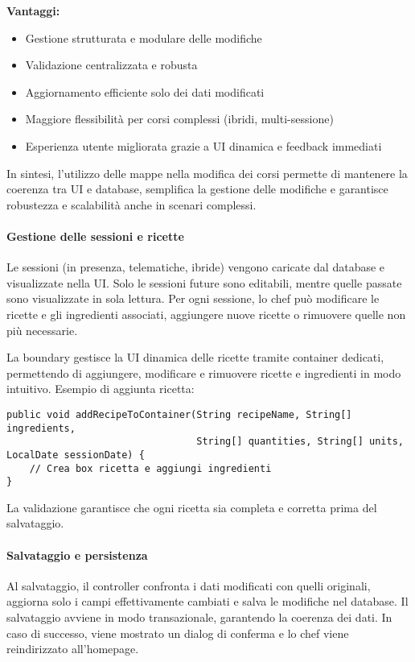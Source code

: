 \textbf{Vantaggi:}
\begin{itemize}
    \item Gestione strutturata e modulare delle modifiche
    \item Validazione centralizzata e robusta
    \item Aggiornamento efficiente solo dei dati modificati
    \item Maggiore flessibilità per corsi complessi (ibridi, multi-sessione)
    \item Esperienza utente migliorata grazie a UI dinamica e feedback immediati
\end{itemize}

In sintesi, l'utilizzo delle mappe nella modifica dei corsi permette di mantenere la coerenza tra UI e database, semplifica la gestione delle modifiche e garantisce robustezza e scalabilità anche in scenari complessi.

\paragraph{Gestione delle sessioni e ricette}
Le sessioni (in presenza, telematiche, ibride) vengono caricate dal database e visualizzate nella UI. Solo le sessioni future sono editabili, mentre quelle passate sono visualizzate in sola lettura. Per ogni sessione, lo chef può modificare le ricette e gli ingredienti associati, aggiungere nuove ricette o rimuovere quelle non più necessarie.

La boundary gestisce la UI dinamica delle ricette tramite container dedicati, permettendo di aggiungere, modificare e rimuovere ricette e ingredienti in modo intuitivo. Esempio di aggiunta ricetta:
\begin{verbatim}
public void addRecipeToContainer(String recipeName, String[] ingredients,
                                 String[] quantities, String[] units, LocalDate sessionDate) {
    // Crea box ricetta e aggiungi ingredienti
}
\end{verbatim}
La validazione garantisce che ogni ricetta sia completa e corretta prima del salvataggio.

\paragraph{Salvataggio e persistenza}
Al salvataggio, il controller confronta i dati modificati con quelli originali, aggiorna solo i campi effettivamente cambiati e salva le modifiche nel database. Il salvataggio avviene in modo transazionale, garantendo la coerenza dei dati. In caso di successo, viene mostrato un dialog di conferma e lo chef viene reindirizzato all'homepage.


